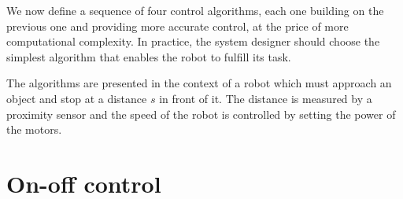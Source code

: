 
We now define a sequence of four control algorithms, each one building on the previous one and providing more accurate control, at the price of more computational complexity. In practice, the system designer should choose the simplest algorithm that enables the robot to fulfill its task.

The algorithms are presented in the context of a robot which must approach an object and stop at a distance $s$ in front of it. The distance is measured by a proximity sensor and the speed of the robot is controlled by setting the power of the motors.


\section{On-off control}\label{s.on-off}

